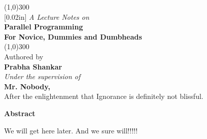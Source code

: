 \documentclass[12pt, a4paper]{report}
\begin{document}
\begin{titlepage}
    \begin{center}
    \line(1,0){300}\\
    [0.02in]
    \large{\emph {A Lecture Notes on}}\\	
    \Huge{\bfseries Parallel Programming}\\
    \large{\bfseries For Novice, Dummies and Dumbheads}\\
    [-0.12in]
    \line(1,0){300}\\
    
    \vspace{0.35in}
    \normalsize{Authored by}\\
    
    \LARGE{\bfseries {Prabha Shankar}}\\
    
    \vspace{1.5cm}
    \normalsize{\emph {Under the supervision of}}\\
    \large{\bfseries {Mr. Nobody,}}\\
    \small{After the enlightenment that Ignorance is definitely not blissful.}\\
    
\end{center}
\end{titlepage}



\begin{titlepage}
    \begin{center}
    \bfseries{Abstract}
    \end{center}
    \vspace{0.8cm}

    We will get here later. And we sure will!!!!! 

\end{titlepage}




\begin{titlepage}
\tableofcontents
\end{titlepage}
\listoffigures
\cleardoublepage
\end{document}
